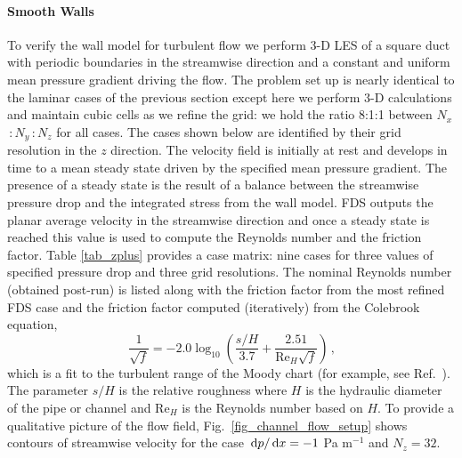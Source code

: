 \documentclass[11pt]{book}
\begin{document}
\paragraph{Smooth Walls}

To verify the wall model for turbulent flow we perform 3-D LES of a square duct with periodic boundaries in the streamwise direction and a constant and uniform mean pressure gradient driving the flow.  The problem set up is nearly identical to the laminar cases of the previous section except here we perform 3-D calculations and maintain cubic cells as we refine the grid: we hold the ratio 8:1:1 between $N_x$\,:\,$N_y$\,:\,$N_z$ for all cases.  The cases shown below are identified by their grid resolution in the $z$ direction.  The velocity field is initially at rest and develops in time to a mean steady state driven by the specified mean pressure gradient.  The presence of a steady state is the result of a balance between the streamwise pressure drop and the integrated stress from the wall model.  FDS outputs the planar average velocity in the streamwise direction and once a steady state is reached this value is used to compute the Reynolds number and the friction factor.  Table \ref{tab_zplus} provides a case matrix: nine cases for three values of specified pressure drop and three grid resolutions.  The nominal Reynolds number (obtained post-run) is listed along with the friction factor from the most refined FDS case and the friction factor computed (iteratively) from the Colebrook equation,
\begin{equation}
\label{eqn_colebrook}
\frac{1}{\sqrt{f}} = -2.0 \log_{10} \left( \frac{s/H}{3.7} + \frac{2.51}{\mbox{Re}_H\sqrt{f}} \right) \,\mbox{,}
\end{equation}
which is a fit to the turbulent range of the Moody chart (for example, see Ref.~\cite{MYO}).  The parameter $s/H$ is the relative
roughness where $H$ is the hydraulic diameter of the pipe or channel and Re$_H$ is the Reynolds number based on $H$.
To provide a qualitative picture of the flow field, Fig.~\ref{fig_channel_flow_setup} shows contours of streamwise velocity
for the case $\,\mathrm{d} p/\,\mathrm{d} x = -1$ Pa m$^{-1}$ and $N_z=32$.
\end{document}
